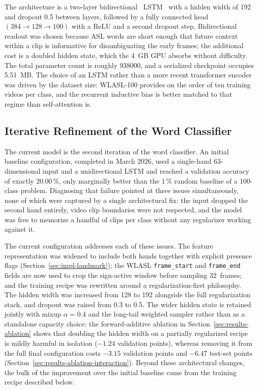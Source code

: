 The architecture is a two-layer
bidirectional~\cite{schuster1997bidirectional}
LSTM~\cite{hochreiter1997lstm} with a hidden width of 192 and
dropout 0.5 between layers, followed by a fully connected head
$(384 \rightarrow 128 \rightarrow 100)$ with a ReLU and a second
dropout step. Bidirectional readout was chosen because ASL words are
short enough that future context within a clip is informative for
disambiguating the early frames; the additional cost is a doubled
hidden state, which the 4~GB GPU absorbs without difficulty. The
total parameter count is roughly \num{938000}, and a serialized
checkpoint occupies 5.51~MB. The choice of an LSTM rather than a
more recent transformer encoder was driven by the dataset size:
WLASL-100 provides on the order of ten training videos per class,
and the recurrent inductive bias is better matched to that regime
than self-attention is.

\subsection{Iterative Refinement of the Word Classifier}
\label{sec:impl-lstm-v1v2}

The current model is the second iteration of the word classifier.
An initial baseline configuration, completed in March 2026, used a
single-hand 63-dimensional input and a unidirectional LSTM and
reached a validation accuracy of exactly 20.00\,\%, only marginally
better than the 1\,\% random baseline of a 100-class problem.
Diagnosing that failure pointed at three issues simultaneously, none
of which were captured by a single architectural fix: the input
dropped the second hand entirely, video clip boundaries were not
respected, and the model was free to memorize a handful of clips per
class without any regularizer working against it.

The current configuration addresses each of these issues. The
feature representation was widened to include both hands together
with explicit presence flags (Section~\ref{sec:impl-landmark}); the
WLASL \texttt{frame\_start} and \texttt{frame\_end} fields are now
used to crop the sign-active window before sampling 32~frames; and
the training recipe was rewritten around a regularization-first
philosophy. The hidden width was increased from 128 to 192 alongside
the full regularization stack, and dropout was raised from 0.3 to
0.5. The wider hidden state is retained jointly with mixup
$\alpha = 0.4$ and the long-tail weighted sampler rather than as a
standalone capacity choice: the forward-additive ablation in
Section~\ref{sec:results-ablation} shows that doubling the hidden
width on a partially regularized recipe is mildly harmful in
isolation ($-1.24$ validation points), whereas removing it from the
full final configuration costs $-3.15$ validation points and $-6.47$
test-set points (Section~\ref{sec:results-ablation-interaction}).
Beyond these architectural changes, the bulk of the improvement over
the initial baseline came from the training recipe described below.


